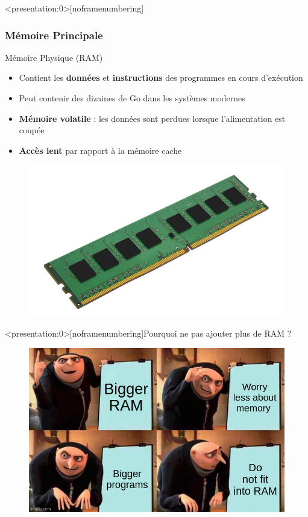 \documentclass[8pt]{beamer}
\begin{document}
\begin{frame}<presentation:0>[noframenumbering]
    \frametitle{Mémoire Principale}
    \begin{block}{Mémoire Physique (RAM)}
        \begin{itemize}
            \item Contient les \textbf{données} et \textbf{instructions} des
                  programmes en cours d'exécution
            \item Peut contenir des dizaines de Go dans les
                  systèmes modernes
            \item \textbf{Mémoire volatile} : les données sont perdues lorsque
                  l'alimentation est coupée
            \item \textbf{Accès lent} par rapport à la mémoire cache
        \end{itemize}
    \end{block}
    \begin{figure}
        \centering
        \includegraphics[width=.5\textwidth]{figures/DRAM.png}
    \end{figure}
\end{frame}

\begin{frame}<presentation:0>[noframenumbering]{Pourquoi ne pas ajouter plus de
        RAM ?}
    \begin{figure}
        \centering
        \includegraphics[width=.75\textwidth]{figures/RAM_meme.jpg}
    \end{figure}
\end{frame}
\end{document}
